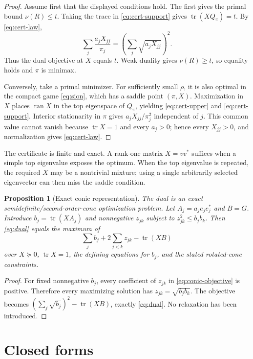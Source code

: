 \documentclass[11pt]{article}
\newtheorem{proposition}[theorem]{Proposition}
\theoremstyle{definition}
\newcommand{\tr}{\operatorname{tr}}
\newcommand{\ran}{\operatorname{ran}}
\begin{document}
\begin{proof}
Assume first that the displayed conditions hold.  The first gives the primal bound
$\nu(R)\le t$.  Taking the trace in \eqref{eq:cert-support} gives
$\tr(XQ_\pi)=t$.  By \eqref{eq:cert-law},
\[
  \sum_j\frac{a_jX_{jj}}{\pi_j}
  =\left(\sum_j\sqrt{a_jX_{jj}}\right)^2.
\]
Thus the dual objective at $X$ equals $t$.  Weak duality gives $\nu(R)\ge t$, so equality holds
and $\pi$ is minimax.

Conversely, take a primal minimizer.  For sufficiently small $\rho$, it is also optimal in the
compact game \eqref{eq:sion}, which has a saddle point $(\pi,X)$.  Maximization in $X$ places
$\ran X$ in the top eigenspace of $Q_\pi$, yielding \eqref{eq:cert-upper} and
\eqref{eq:cert-support}.  Interior stationarity in $\pi$ gives
$a_jX_{jj}/\pi_j^2$ independent of $j$.  This common value cannot vanish because
$\tr X=1$ and every $a_j>0$; hence every $X_{jj}>0$, and normalization gives
\eqref{eq:cert-law}.
\end{proof}

The certificate is finite and exact.  A rank-one matrix $X=vv^*$ suffices when a simple top
eigenvalue exposes the optimum.  When the top eigenvalue is repeated, the required $X$ may be a
nontrivial mixture; using a single arbitrarily selected eigenvector can then miss the saddle
condition.

\begin{proposition}[Exact conic representation]
\label{prop:conic}
The dual is an exact semidefinite/second-order-cone optimization problem.  Let
$A_j=a_je_je_j^*$ and $B=G$.  Introduce
$b_j=\tr(XA_j)$ and nonnegative $z_{jk}$ subject to
$z_{jk}^2\le b_jb_k$.  Then \eqref{eq:dual} equals the maximum of
\begin{equation}
  \sum_jb_j+2\sum_{j<k}z_{jk}-\tr(XB)
  \label{eq:conic-objective}
\end{equation}
over $X\succeq0$, $\tr X=1$, the defining equations for $b_j$, and the stated rotated-cone
constraints.
\end{proposition}

\begin{proof}
For fixed nonnegative $b_j$, every coefficient of $z_{jk}$ in
\eqref{eq:conic-objective} is positive.  Therefore every maximizing solution has
$z_{jk}=\sqrt{b_jb_k}$.  The objective becomes
$(\sum_j\sqrt{b_j})^2-\tr(XB)$, exactly \eqref{eq:dual}.  No relaxation has been introduced.
\end{proof}

\section{Closed forms}
\end{document}

